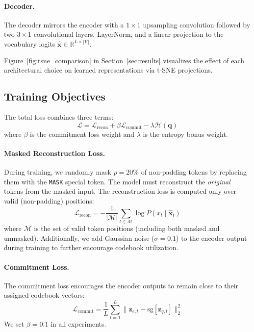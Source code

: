 \documentclass[pmlr]{jmlr}%
\begin{document}
\paragraph{Decoder.}
The decoder mirrors the encoder with a $1 \times 1$ upsampling convolution followed by two $3 \times 1$ convolutional layers, LayerNorm, and a linear projection to the vocabulary logits $\hat{\mathbf{x}} \in \mathbb{R}^{L \times |\mathcal{V}|}$.

Figure~\ref{fig:tsne_comparison} in Section~\ref{sec:results} visualizes the effect of each architectural choice on learned representations via t-SNE projections.

\subsection{Training Objectives}
\label{sec:training}

The total loss combines three terms:
\begin{equation}
    \mathcal{L} = \mathcal{L}_\text{recon} + \beta \mathcal{L}_\text{commit} - \lambda \mathcal{H}(\mathbf{q})
    \label{eq:total_loss}
\end{equation}
where $\beta $ is the commitment loss weight and $\lambda $ is the entropy bonus weight.
\paragraph{Masked Reconstruction Loss.}
During training, we randomly mask $p = 20\%$ of non-padding tokens by replacing them with the \texttt{MASK} special token. The model must reconstruct the \emph{original} tokens from the masked input. The reconstruction loss is computed only over valid (non-padding) positions:
\begin{equation}
    \mathcal{L}_\text{recon} = -\frac{1}{|\mathcal{M}|} \sum_{t \in \mathcal{M}} \log P(x_t \mid \hat{\mathbf{x}}_t)
\end{equation}
where $\mathcal{M}$ is the set of valid token positions (including both masked and unmasked). Additionally, we add Gaussian noise ($\sigma = 0.1$) to the encoder output during training to further encourage codebook utilization.

\paragraph{Commitment Loss.}
The commitment loss encourages the encoder outputs to remain close to their assigned codebook vectors:
\begin{equation}
    \mathcal{L}_\text{commit} = \frac{1}{L} \sum_{t=1}^{L} \|\mathbf{z}_{e,t} - \text{sg}[\mathbf{z}_{q,t}]\|_2^2
\end{equation}
We set $\beta = 0.1$ in all experiments.
\end{document}
